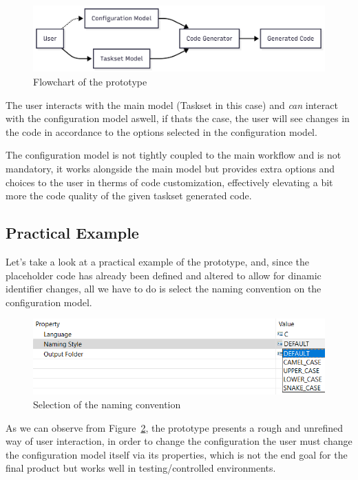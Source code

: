 \begin{figure}[htbp]
	\centering
	\includegraphics[height=0.22\textwidth]{prototype_flowchart.png}
	\caption{Flowchart of the prototype}
	\label{fig:prototype_flowchart}
\end{figure}

The user interacts with the main model (Taskset in this case) and \textit{can} interact with the configuration model aswell, if thats the case, the user will see changes in the code in accordance to the options selected in the configuration model.

The configuration model is not tightly coupled to the main workflow and is not mandatory, it works alongside the main model but provides extra options and choices to the user in therms of code customization, effectively elevating a bit more the code quality of the given taskset generated code.

\subsection{Practical Example}
\label{sec:practical_example}
 
Let's take a look at a practical example of the prototype, and, since the placeholder code has already been defined and altered to allow for dinamic identifier changes, all we have to do is select the naming convention on the configuration model.

\begin{figure}[htbp]
	\centering
	\includegraphics[height=0.22\textwidth]{naming_convention_selection.png}
	\caption{Selection of the naming convention}
	\label{fig:prototype_selection}
\end{figure}

As we can observe from Figure~\ref{fig:prototype_selection}, the prototype presents a rough and unrefined way of user interaction, in order to change the configuration the user must change the configuration model itself via its properties, which is not the end goal for the final product but works well in testing/controlled environments. 

